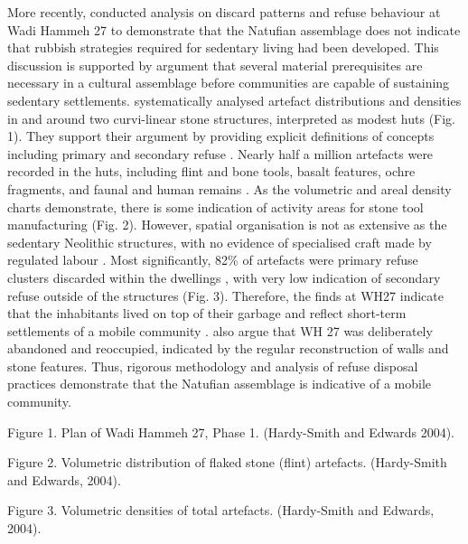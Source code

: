 \documentclass[%
	]{ijsra}
\begin{document}
More recently, \textcite{Hardy-Smith_2004} conducted analysis on discard patterns and refuse behaviour at Wadi Hammeh 27 to demonstrate that the Natufian assemblage does not indicate that rubbish strategies required for sedentary living had been developed. 
This discussion is supported by  argument that several material prerequisites are necessary in a cultural assemblage before communities are capable of sustaining sedentary settlements. 
\textcite[253]{Hardy-Smith_2004} systematically analysed artefact distributions and densities in and around two curvi-linear stone structures, interpreted as modest huts (Fig. 1). 
They support their argument by providing explicit definitions of concepts including primary and secondary refuse \parencite[255]{Hardy-Smith_2004}. 
Nearly half a million artefacts were recorded in the huts, including flint and bone tools, basalt features, ochre fragments, and faunal and human remains \parencite[279]{Hardy-Smith_2004}. 
As the volumetric and areal density charts demonstrate, there is some indication of activity areas for stone tool manufacturing (Fig. 2). However, spatial organisation is not as extensive as the sedentary Neolithic structures, with no evidence of specialised craft made by regulated labour \parencite[282]{Hardy-Smith_2004}. 
Most significantly, 82\% of artefacts were primary refuse clusters discarded within the dwellings \parencite[279]{Hardy-Smith_2004}, with very low indication of secondary refuse outside of the structures (Fig. 3). 
Therefore, the finds at WH27 indicate that the inhabitants lived on top of their garbage and reflect short-term settlements of a mobile community \parencite[285]{Hardy-Smith_2004}. 
\textcite[259]{Hardy-Smith_2004} also argue that WH 27 was deliberately abandoned and reoccupied, indicated by the regular reconstruction of walls and stone features. Thus, rigorous methodology and analysis of refuse disposal practices demonstrate that the Natufian assemblage is indicative of a mobile community.

Figure 1. Plan of Wadi Hammeh 27, Phase 1. (Hardy-Smith and Edwards 2004).

Figure 2. Volumetric distribution of flaked stone (flint) artefacts. (Hardy-Smith and Edwards, 2004).

Figure 3. Volumetric densities of total artefacts. (Hardy-Smith and Edwards, 2004).

\end{document}
